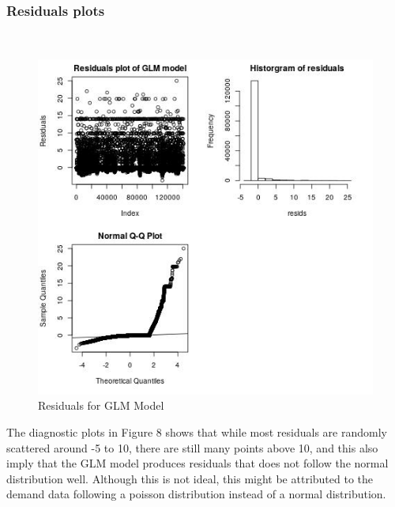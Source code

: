 \documentclass[nonblindrev,msom]{informs3} %
\begin{document}
\newpage
\subsubsection{Residuals plots}
\hfill\\
\begin{figure}[H]
    \centering
    \includegraphics[width=\textwidth, height=0.7\textheight]{Images/Full_GLM_resids.jpg}
    \caption{Residuals for GLM Model}
    \label{fig:Residuals for GLM Model}
\end{figure}

\noindent The diagnostic plots in Figure 8 shows that while most residuals are randomly scattered around -5 to 10, there are still many points above 10, and this also imply that the GLM model produces residuals that does not follow the normal distribution well. Although this is not ideal, this might be attributed to the demand data following a poisson distribution instead of a normal distribution. 
\end{document}
